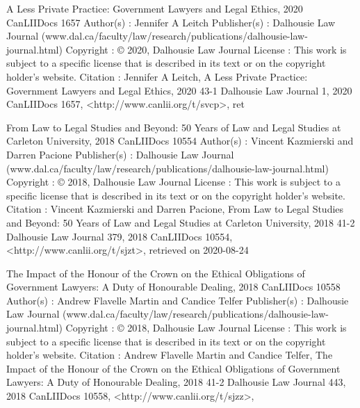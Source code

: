 


A Less Private Practice: Government Lawyers and Legal Ethics, 2020 CanLIIDocs 1657
Author(s) : 	Jennifer A Leitch
Publisher(s) : 	Dalhousie Law Journal (www.dal.ca/faculty/law/research/publications/dalhousie-law-journal.html)
Copyright : 	© 2020, Dalhousie Law Journal
License : 	This work is subject to a specific license that is described in its text or on the copyright holder's website.
Citation : 	Jennifer A Leitch, A Less Private Practice: Government Lawyers and Legal Ethics, 2020 43-1 Dalhousie Law Journal 1, 2020 CanLIIDocs 1657, <http://www.canlii.org/t/svcp>, ret



From Law to Legal Studies and Beyond: 50 Years of Law and Legal Studies at Carleton University, 2018 CanLIIDocs 10554
Author(s) : 	Vincent Kazmierski and Darren Pacione
Publisher(s) : 	Dalhousie Law Journal (www.dal.ca/faculty/law/research/publications/dalhousie-law-journal.html)
Copyright : 	© 2018, Dalhousie Law Journal
License : 	This work is subject to a specific license that is described in its text or on the copyright holder's website.
Citation : 	Vincent Kazmierski and Darren Pacione, From Law to Legal Studies and Beyond: 50 Years of Law and Legal Studies at Carleton University, 2018 41-2 Dalhousie Law Journal 379, 2018 CanLIIDocs 10554, <http://www.canlii.org/t/sjzt>, retrieved on 2020-08-24



The Impact of the Honour of the Crown on the Ethical Obligations of Government Lawyers: A Duty of Honourable Dealing, 2018 CanLIIDocs 10558
Author(s) : 	Andrew Flavelle Martin and Candice Telfer
Publisher(s) : 	Dalhousie Law Journal (www.dal.ca/faculty/law/research/publications/dalhousie-law-journal.html)
Copyright : 	© 2018, Dalhousie Law Journal
License : 	This work is subject to a specific license that is described in its text or on the copyright holder's website.
Citation : 	Andrew Flavelle Martin and Candice Telfer, The Impact of the Honour of the Crown on the Ethical Obligations of Government Lawyers: A Duty of Honourable Dealing, 2018 41-2 Dalhousie Law Journal 443, 2018 CanLIIDocs 10558, <http://www.canlii.org/t/sjzz>, 



